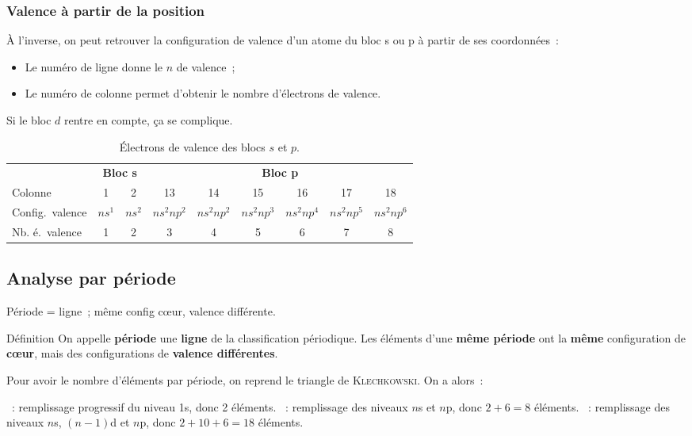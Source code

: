 \documentclass[../main/main.tex]{subfiles}
\begin{document}
\subsubsection{Valence à partir de la position}

À l'inverse, on peut retrouver la configuration de valence d'un atome du bloc s
ou p à partir de ses coordonnées~:
\begin{itemize}
    \item Le numéro de ligne donne le $n$ de valence~;
    \item Le numéro de colonne permet d'obtenir le nombre d'électrons de
        valence.
\end{itemize}
Si le bloc $d$ rentre en compte, ça se complique.

\begin{table}[ht]
    \centering
    \caption{Électrons de valence des blocs $s$ et $p$.}
    \label{tab:valsp}
    \begin{tabular}{lcccccccc}
        \toprule
        &
        \multicolumn{2}{c}{\textbf{Bloc s}} &
        \multicolumn{6}{c}{\textbf{Bloc p}}
        \\ \cmidrule(lr){2-3} \cmidrule(lr){4-9}
        Colonne & 1 & 2 & 13 & 14 & 15 & 16 & 17 & 18
        \\\midrule
        Config.\ valence & $ns^1$ & $ns^2$ & $ns^2np^2$ & $ns^2np^2$ & $ns^2np^3$ &
        $ns^2np^4$ & $ns^2np^5$ & $ns^2np^6$
        \\\midrule
        Nb. é.\ valence & 1 & 2 & 3 & 4 & 5 & 6 & 7 & 8
        \\\bottomrule
    \end{tabular}
\end{table}

\subsection{Analyse par période}
Période = ligne~; même config cœur, valence différente.
\begin{tdefi}{Définition}
    On appelle \textbf{période} une \textbf{ligne} de la classification
    périodique. Les éléments d'une \textbf{même période} ont la \textbf{même}
    configuration de \textbf{cœur}, mais des configurations de \textbf{valence
    différentes}.
\end{tdefi}

Pour avoir le nombre d'éléments par période, on reprend le triangle de
\textsc{Klechkowski}. On a alors~:
\begin{itemize}
    ~: remplissage progressif du niveau 1s, donc 2 éléments.
    ~: remplissage des niveaux $n$s et $n$p, donc $2+6=8$
        éléments.
    ~: remplissage des niveaux $n$s, $(n-1)$d et $n$p, donc
        $2+10+6=18$ éléments.
\end{itemize}
\end{document}
